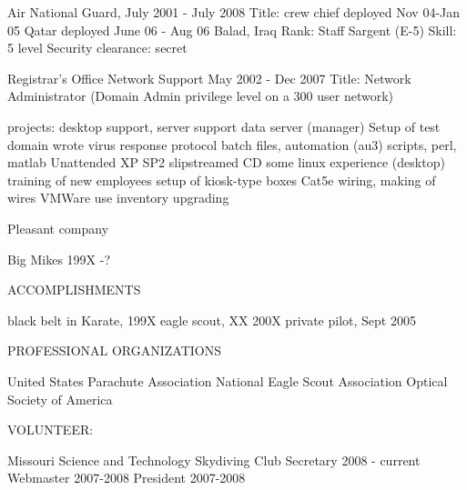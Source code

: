 Air National Guard, July 2001 - July 2008
    Title: crew chief
        deployed Nov 04-Jan 05 Qatar
        deployed June 06 - Aug 06 Balad, Iraq
    Rank: Staff Sargent (E-5)
    Skill: 5 level
    Security clearance: secret

Registrar's Office Network Support May 2002 - Dec 2007
    Title: Network Administrator (Domain Admin privilege level on a 300 user network)

    projects: desktop support, server support
        data server (manager)
        Setup of test domain
        wrote virus response protocol
         batch files, automation (au3) scripts, perl, matlab
         Unattended XP SP2 slipstreamed CD
         some linux experience (desktop)
         training of new employees
         setup of kiosk-type boxes
         Cat5e wiring, making of wires
         VMWare use
         inventory
         upgrading

Pleasant company

Big Mikes 199X -?

ACCOMPLISHMENTS

black belt in Karate, 199X
eagle scout, XX 200X
private pilot, Sept 2005

PROFESSIONAL ORGANIZATIONS

United States Parachute Association
National Eagle Scout Association
Optical Society of America

VOLUNTEER:

Missouri Science and Technology Skydiving Club
Secretary 2008 - current
Webmaster 2007-2008
President 2007-2008

